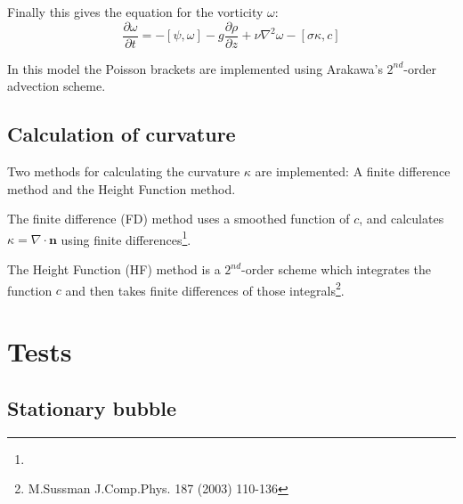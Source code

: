 \documentclass[12pt,a4paper]{article}
\begin{document}
Finally this gives the equation for the vorticity $\omega$:
\begin{equation}
\frac{\partial\omega}{\partial t} = -\left[\psi, \omega\right] - g\frac{\partial\rho}{\partial z} + \nu\nabla^2\omega - \left[\sigma\kappa, c\right]
\end{equation}

In this model the Poisson brackets are implemented using Arakawa's $2^{nd}$-order advection scheme.

\subsection{Calculation of curvature}
\label{sec:curvature}

Two methods for calculating the curvature $\kappa$ are implemented: A finite difference method and the Height Function method. 

The finite difference (FD) method uses a smoothed function of $c$, and calculates $\kappa = \nabla\cdot\mathbf{n}$ using finite differences\footnote{}.

The Height Function (HF) method is a $2^{nd}$-order scheme which integrates the function $c$ and then takes finite differences of those integrals\footnote{M.Sussman J.Comp.Phys. 187 (2003) 110-136}.
\section{Tests}

\subsection{Stationary bubble}
\end{document}
